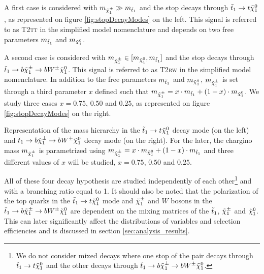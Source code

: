         A first case is considered with $m_{\tilde{\chi}_1^\pm} \gg m_{\tilde{t}_1}$ and the stop
        decays through $\tilde{t}_1 \rightarrow t \tilde{\chi}_1^0$, as represented on figure
        \ref{fig:stopDecayModes} on the left. This signal is referred to as \textsc{T2tt}
        in the simplified model nomenclature and depends on two free parameters
        $m_{\tilde{t}_1}$ and $m_{\tilde{\chi}_1^0}$.

        A second case is considered with $m_{\tilde{\chi}_1^\pm} \in [m_{\tilde{\chi}_1^0},
        m_{\tilde{t}_1}]$ and the stop decays through $\tilde{t}_1 \rightarrow b \tilde{\chi}_1^\pm
        \rightarrow b W^{\pm} \tilde{\chi}_1^0$. This signal is referred to as \textsc{T2bw}
        in the simplified model nomenclature. In addition to the free  parameters
        $m_{\tilde{t}_1}$ and $m_{\tilde{\chi}_1^0}$, $m_{\tilde{\chi}_1^\pm}$ is set through a
        third parameter $x$ defined such that $m_{\tilde{\chi}_1^\pm} = x \cdot m_{\tilde{t}_1}
        + (1 - x) \cdot m_{\tilde{\chi}_1^0}$. We study three cases $x = 0.75$, $0.50$
        and $0.25$, as represented on figure \ref{fig:stopDecayModes} on the right.

                     {Representation of the mass hierarchy in the $\tilde{t}_1 \rightarrow t
                     \tilde{\chi}_1^0$ decay mode (on the left) and $\tilde{t}_1 \rightarrow b
                     \tilde{\chi}_1^\pm \rightarrow b W^{\pm} \tilde{\chi}_1^0 $ decay mode (on the
                     right). For the later, the chargino mass $m_{\tilde{\chi}_1^\pm}$ is
                     parametrized using $m_{\tilde{\chi}_1^\pm} = x \cdot m_{\tilde{\chi}_1^0}
                     + (1 - x) \cdot m_{\tilde{t}_1}$ and three different values of $x$ will
                     be studied, $x = 0.75$, $0.50$ and $0.25$.}

        All of these four decay hypothesis are studied independently
        of each other\footnote{We do not consider mixed decays where one stop of the pair
        decays through $\tilde{t}_1 \rightarrow t \tilde{\chi}_1^0$ and the other decays through
        $\tilde{t}_1 \rightarrow b \tilde{\chi}_1^\pm \rightarrow b W^{\pm} \tilde{\chi}_1^0$.} and with a
        branching ratio equal to 1. It should also be noted that the polarization of the
        top quarks in the $\tilde{t}_1 \rightarrow t \tilde{\chi}_1^0$ mode and $\tilde{\chi}_1^\pm$ and
        $W$ bosons in the $\tilde{t}_1 \rightarrow b \tilde{\chi}_1^\pm \rightarrow b W^{\pm}
        \tilde{\chi}_1^0$ are dependent on the mixing matrices of the $\tilde{t}_1$, $\tilde{\chi}_1^\pm$
        and $\tilde{\chi}_1^0$. This can later significantly affect the distributions of
        variables and selection efficiencies and is discussed in section
        \ref{sec:analysis_results}.

